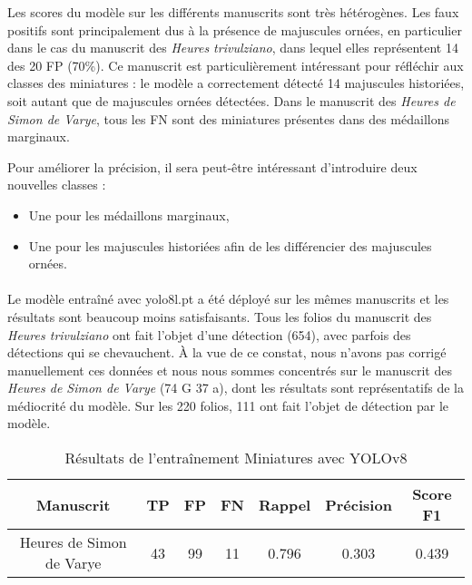 \documentclass[12pt,twoside]{book}
\begin{document}
Les scores du modèle sur les différents manuscrits sont très hétérogènes. Les faux positifs sont principalement dus à la présence de majuscules ornées, en particulier dans le cas du manuscrit des \textit{Heures trivulziano}, dans lequel elles représentent 14 des 20 FP (70\%). Ce manuscrit est particulièrement intéressant pour réfléchir aux classes des miniatures :  le modèle a correctement détecté 14 majuscules historiées, soit autant que de majuscules ornées détectées. Dans le manuscrit des \textit{Heures de Simon de Varye}, tous les FN sont des miniatures présentes dans des médaillons marginaux.

Pour améliorer la précision, il sera peut-être intéressant d’introduire deux nouvelles classes : \\
\begin{itemize}
    \item Une pour les médaillons marginaux,
    \item Une pour les majuscules historiées afin de les différencier des majuscules ornées. 
\end{itemize}

\paragraph{}Le modèle entraîné avec yolo8l.pt a été déployé sur les mêmes manuscrits et les résultats sont beaucoup moins satisfaisants. Tous les folios du manuscrit des \textit{Heures trivulziano} ont fait l’objet d’une détection (654), avec parfois des détections qui se chevauchent. À la vue de ce constat, nous n’avons pas corrigé manuellement ces données et nous nous sommes concentrés sur le manuscrit des \textit{Heures de Simon de Varye} (74 G 37 a), dont les résultats sont représentatifs de la médiocrité du modèle. Sur les 220 folios, 111 ont fait l’objet de détection par le modèle.\\

\begin{table}[ht]
    \centering
    \begin{tabular}{|c|c|c|c|c|c|c|}
    \hline
    \textbf{Manuscrit} & \textbf{TP} & \textbf{FP} & \textbf{FN} & \textbf{Rappel} & \textbf{Précision} & \textbf{Score F1} \\
    \hline
    Heures de Simon de Varye & 43 & 99 & 11 & 0.796 & 0.303 & 0.439 \\ 
    \hline
    \end{tabular}
    \caption{Résultats de l'entraînement Miniatures avec YOLOv8}
\end{table}
\end{document}
